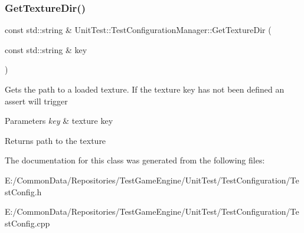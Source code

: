 \subsubsection{\texorpdfstring{GetTextureDir()}{GetTextureDir()}}
{\footnotesize\ttfamily const std\+::string \& Unit\+Test\+::\+Test\+Configuration\+Manager\+::\+Get\+Texture\+Dir (\begin{DoxyParamCaption}\item[{const std\+::string \&}]{key }\end{DoxyParamCaption})}

Gets the path to a loaded texture. If the texture key has not been defined an assert will trigger 
\begin{DoxyParams}{Parameters}
{\em key} & texture key \\
\hline
\end{DoxyParams}
\begin{DoxyReturn}{Returns}
path to the texture 
\end{DoxyReturn}


The documentation for this class was generated from the following files\+:\begin{DoxyCompactItemize}
\item 
E\+:/\+Common\+Data/\+Repositories/\+Test\+Game\+Engine/\+Unit\+Test/\+Test\+Configuration/Test\+Config.\+h\item 
E\+:/\+Common\+Data/\+Repositories/\+Test\+Game\+Engine/\+Unit\+Test/\+Test\+Configuration/Test\+Config.\+cpp\end{DoxyCompactItemize}

